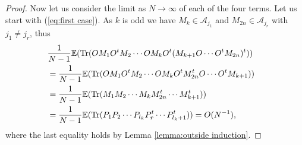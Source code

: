 \documentclass[11pt]{amsart}
\theoremstyle{definition}
\numberwithin{theorem}{section}
\newcommand{\cA}{\mathcal{A}}
\newcommand{\rE} {\mathbb{E}}
\newcommand{\Tr}{\mathrm{Tr}}
\begin{document}
\begin{proof}
Now let us consider the limit as $N \to \infty$ of each of
the four terms. Let us start with (\ref{eq:first case}). As
$k$ is odd we have $M_k \in \cA_{j_1}$ and $M_{2n} \in
\cA_{j_r}$ with $j_1 \not = j_r$, thus
\begin{align*} \lefteqn{
\frac{1}{N - 1}\rE( \Tr(O M_1 O^t M_2 \cdots O M_kO^t (M_{k + 1} O \cdots O^t M_{2n})^t ))} \\
& \mbox{} =
\frac{1}{N - 1}\rE( \Tr(O M_1 O^t M_2 \cdots O M_kO^t M_{2n}^t O \cdots O^t M_{k+1})) \\
& \mbox{} =
\frac{1}{N - 1}\rE( \Tr(M_1 M_2 \cdots M_k M_{2n}^t  \cdots  M_{k+1}^t)) \\
& \mbox{} =
\frac{1}{N - 1}\rE( \Tr(P_1 P_2 \cdots P_{l_k} P_{r}^t  \cdots  P_{l_k+1}^t)) = O(N^{-1}),\\
\end{align*}
where the last equality holds by Lemma \ref{lemma:outside induction}.





\end{proof}
\end{document}
